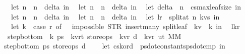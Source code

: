 \begin{isabellebody}
\ \ let\ n{}\ {\isacharequal}\ n{}\ {\isacharminus}\ delta\ in\isanewline
\ \ let\ n{}\ {\isacharequal}\ n{}\ {\isacharplus}\ delta\ in\isanewline
\ \ let\ delta\ {\isacharequal}\ {\isacharparenleft}n{}\ {\isacharminus}\ cs{}{\isacharbar}{\isachargreater}max{\isacharunderscore}leaf{\isacharunderscore}size{\isacharparenright}\ in\isanewline
\ \ let\ n{}\ {\isacharequal}\ n{}\ {\isacharminus}\ delta\ in\isanewline
\ \ let\ n{}\ {\isacharequal}\ n{}\ {\isacharplus}\ delta\ in\isanewline
\ \ let\ {\isacharparenleft}l{\isacharcomma}r{\isacharparenright}\ {\isacharequal}\ split{\isacharunderscore}at\ n{}\ kvs\ in\isanewline
\ \ let\ k\ {\isacharequal}\ {\isacharparenleft}case\ r\ of\ {\isacharbrackleft}{\isacharbrackright}\ {\isasymRightarrow}\ impossible{}\ {\isacharparenleft}STR\ {\isacharprime}{\isacharprime}insert{\isacharunderscore}many{\isacharcolon}\ split{\isacharunderscore}leaf{\isacharprime}{\isacharprime}{\isacharparenright}\ {\isacharbar}\ {\isacharparenleft}k{\isacharcomma}v{\isacharparenright}{\isacharhash}{\isacharunderscore}\ {\isasymRightarrow}\ k{\isacharparenright}\ in\isanewline
\ \ {\isacharparenleft}l{\isacharcomma}k{\isacharcomma}r{\isacharparenright}\isanewline
{\isacharparenright}{\isachardoublequoteclose}\isanewline
\isanewline
\isanewline
{}\isamarkupfalse%
\ step{\isacharunderscore}bottom\ {\isacharcolon}{\isacharcolon}\ {\isachardoublequoteopen}{\isacharprime}k\ ps{}\ {\isasymRightarrow}\ {\isacharparenleft}{\isacharprime}k{\isacharcomma}{\isacharprime}v{\isacharcomma}{\isacharprime}r{\isacharcomma}{\isacharprime}t{\isacharparenright}\ store{\isacharunderscore}ops\ {\isasymRightarrow}\ {\isacharparenleft}{\isacharprime}k{\isacharcomma}{\isacharprime}v{\isacharcomma}{\isacharprime}r{\isacharparenright}\ d\ {\isasymRightarrow}\ {\isacharparenleft}{\isacharparenleft}{\isacharprime}k{\isacharcomma}{\isacharprime}v{\isacharcomma}{\isacharprime}r{\isacharparenright}\ u{\isacharcomma}{\isacharprime}t{\isacharparenright}\ MM{\isachardoublequoteclose}\ \isanewline
{\isachardoublequoteopen}step{\isacharunderscore}bottom\ ps{}\ store{\isacharunderscore}ops\ d\ {\isacharequal}\ {\isacharparenleft}\isanewline
\ \ let\ {\isacharparenleft}cs{\isacharcomma}k{\isacharunderscore}ord{\isacharparenright}\ {\isacharequal}\ {\isacharparenleft}ps{}{\isacharbar}{\isachargreater}dot{\isacharunderscore}constants{\isacharcomma}ps{}{\isacharbar}{\isachargreater}dot{\isacharunderscore}cmp{\isacharparenright}\ in\isanewline

\end{isabellebody}
